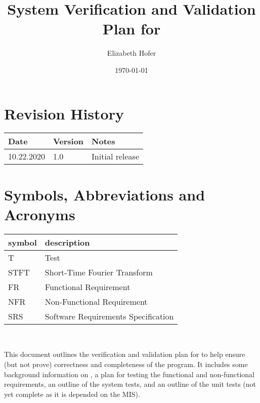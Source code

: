\documentclass[12pt, titlepage]{article}
\begin{document}
\title{System Verification and Validation Plan for \progname{}} 
\author{Elizabeth Hofer}
\date{\today}
	
\maketitle


\section{Revision History}

\begin{tabularx}{\textwidth}{p{3cm}p{2cm}X}
\toprule {\bf Date} & {\bf Version} & {\bf Notes}\\
\midrule
10.22.2020 & 1.0 & Initial release\\
\bottomrule
\end{tabularx}

\newpage

\tableofcontents

\listoftables

\listoffigures

\newpage

\section{Symbols, Abbreviations and Acronyms}

\renewcommand{\arraystretch}{1.2}
\begin{tabular}{l l} 
  \toprule		
  \textbf{symbol} & \textbf{description}\\
  \midrule 
  T & Test\\
  STFT & Short-Time Fourier Transform\\
  FR & Functional Requirement \\
  NFR & Non-Functional Requirement\\  
  SRS & Software Requirements Specification\\ 
   \bottomrule
\end{tabular}\\


\newpage


This document outlines the verification and validation plan for \progname{} to help ensure (but not prove) correctness and completeness of the program. It includes some background information on \progname{}, a plan for testing the functional and non-functional requirements, an outline of the system tests, and an outline of the unit tests  (not yet complete as it is depended on the MIS).
\end{document}
